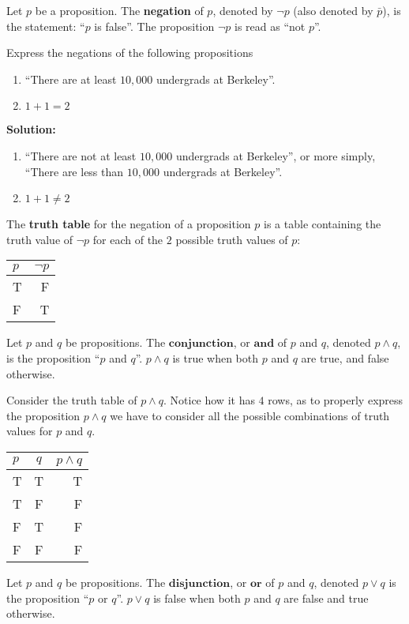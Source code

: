 \documentclass[12t]{scrartcl}
\theoremstyle{plain}
\theoremstyle{definition}
\begin{document}
 Let $p$ be a proposition. The \textbf{negation} of $p$, denoted by $\neg p$ (also denoted by $\bar{p}$), is the statement: ``$p$ is false''. The proposition $\neg p$ is read as ``not $p$''.

\example Express the negations of the following propositions
\begin{enumerate}[nosep]
    \item ``There are at least $10,000$ undergrads at Berkeley''.
    \item $1+1=2$
\end{enumerate}
\vspace{0cm}
\textbf{Solution:}
\begin{enumerate}[nosep]
    \item ``There are not at least $10,000$ undergrads at Berkeley'', or more simply, ``There are less than $10,000$ undergrads at Berkeley''.
    \item $1+1\neq 2$
\end{enumerate}

\vspace{.25cm}
The \textbf{truth table} for the negation of a proposition $p$ is a table containing the truth value of $\neg p$ for each of the $2$ possible truth values of $p$:
\begin{tabular}{l|r}
$p$ & $\neg p$ \\\hline
T & F \\
F & T
\end{tabular}

 Let $p$ and $q$ be propositions. The $\textbf{conjunction}$, or $\textbf{and}$ of $p$ and $q$, denoted $p\wedge q$, is the proposition ``$p$ and $q$''. $p\wedge q$ is true when both $p$ and $q$ are true, and false otherwise.

Consider the truth table of $p\wedge q$. Notice how it has $4$ rows, as to properly express the proposition $p\wedge q$ we have to consider all the possible combinations of truth values for $p$ and $q$.
\begin{tabular}{lc|r}
$p$ & $q$ & $p\wedge q$ \\\hline
T & T & T \\
T & F & F \\
F & T & F \\
F & F & F
\end{tabular}

 Let $p$ and $q$ be propositions. The $\textbf{disjunction}$, or $\textbf{or}$ of $p$ and $q$, denoted $p\vee q$ is the proposition ``$p$ or $q$''. $p\vee q$ is false when both $p$ and $q$ are false and true otherwise.
\end{document}

